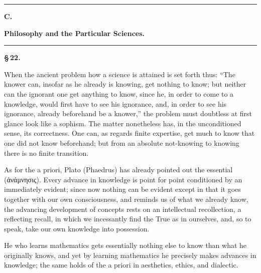 \documentclass[12pt]{book}
\begin{document}
\begin{center}\rule{0.35\linewidth}{0.4pt}\end{center}

\begin{center}
  {\large\bfseries C.}\par\vspace{2pt}
  {\bfseries Philosophy and the Particular Sciences.}\par\vspace{4pt}
  \rule{2cm}{0.4pt}
\end{center}
{}

\begin{center}{\bfseries \S\,22.}\end{center}

When the ancient problem how a science is attained is set forth thus: ``The knower can,
insofar as he already is knowing, get nothing to know; but neither can the ignorant one get
anything to know, since he, in order to come to a knowledge, would first have to see his
ignorance, and, in order to see his ignorance, already beforehand be a knower,'' the problem
must doubtless at first glance look like a sophism. The matter nonetheless has, in the
unconditioned sense, its correctness. One can, as regards finite expertise, get much to know
that one did not know beforehand; but from an absolute not-knowing to knowing there is no
finite transition.

As for the a priori, Plato (Phaedrus) has already pointed out the essential (ἀνάμνησις).
Every advance in knowledge is point for point conditioned by an immediately evident; since
now nothing can be evident except in that it goes together with our own consciousness, and
reminds us of what we already know, the advancing development of concepts rests on an
intellectual recollection, a reflecting recall, in which we incessantly find the True as in
ourselves, and, so to speak, take our own knowledge into possession.

He who learns mathematics gets essentially nothing else to know than what he originally
knows, and yet by learning mathematics he precisely makes advances in knowledge; the same
holds of the a priori in aesthetics, ethics, and dialectic.
\end{document}
